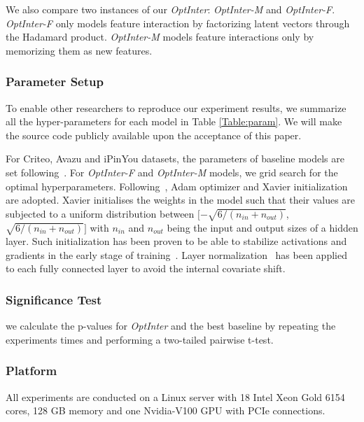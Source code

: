 \documentclass[conference]{IEEEtran}
\begin{document}

We also compare  two instances of our \textit{OptInter}: \textit{OptInter-M} and \textit{OptInter-F}. \textit{OptInter-F} only models feature interaction by factorizing latent vectors through the Hadamard product. \textit{OptInter-M} models feature interactions only by memorizing them as new features. 

\subsubsection{Parameter Setup}

To enable other researchers to reproduce our experiment results, we summarize all the hyper-parameters for each model in Table \ref{Table:param}. We will make the source code publicly available upon the acceptance of this paper.

For Criteo, Avazu and iPinYou datasets, the parameters of baseline models are set following~\cite{PNN19}. For \textit{OptInter-F} and \textit{OptInter-M} models, we grid search for the optimal hyperparameters. Following~\cite{PNN19}, Adam optimizer and Xavier initialization~\cite{Xavier} are adopted. Xavier initialises the weights in the model such that their values are subjected to a uniform distribution between $[-\sqrt{6/(n_{in}+n_{out})}$, $ \sqrt{6/(n_{in}+n_{out})}]$ with $n_{in}$ and $n_{out}$ being the input and output sizes of a hidden layer. Such initialization has been proven to be able to stabilize activations and gradients in the early stage of training~\cite{PNN19}. Layer normalization~\cite{LayerNorm} has been applied to each fully connected layer to avoid the internal covariate shift.

\subsubsection{Significance Test}  
we calculate the p-values for \textit{OptInter} and the best baseline by repeating the experiments  times and performing a two-tailed pairwise t-test.

\subsubsection{Platform}
All experiments are conducted on a Linux server with 18 Intel Xeon Gold 6154 cores, 128 GB memory and one Nvidia-V100 GPU with PCIe connections.
\end{document}
